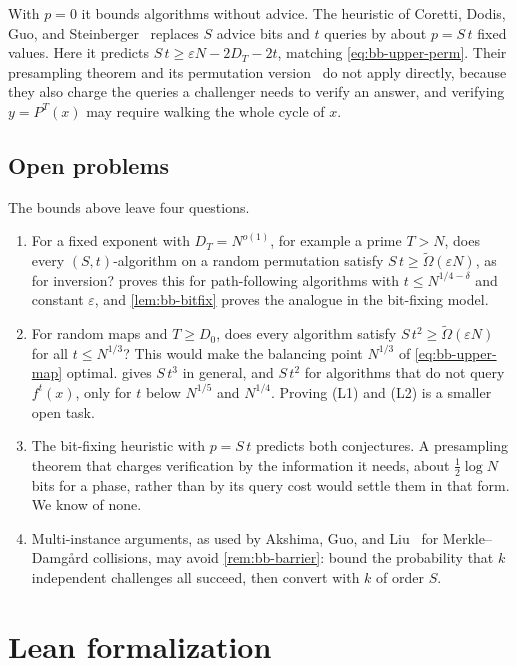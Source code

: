 \documentclass[11pt]{article}
\theoremstyle{definition}
\theoremstyle{remark}
\numberwithin{equation}{section}
\begin{document}
With $p=0$ it bounds algorithms without advice.  The heuristic of
Coretti, Dodis, Guo, and Steinberger~\cite{CDGS18} replaces $S$ advice
bits and $t$ queries by about $p=S\,t$ fixed values.  Here it predicts
$S\,t\geq\varepsilon N-2D_T-2t$, matching \cref{eq:bb-upper-perm}.  Their
presampling theorem and its permutation version~\cite{CDG18} do not apply
directly, because they also charge the queries a challenger needs to
verify an answer, and verifying $y=P^T(x)$ may require walking the whole
cycle of $x$.

\subsection{Open problems}

The bounds above leave four questions.
\begin{enumerate}
\item For a fixed exponent with $D_T=N^{o(1)}$, for example a prime
  $T>N$, does every $(S,t)$-algorithm on a random permutation satisfy
  $S\,t\geq\widetilde\Omega(\varepsilon N)$, as for inversion?
   proves this for path-following algorithms with
  $t\leq N^{1/4-\delta}$ and constant $\varepsilon$, and \cref{lem:bb-bitfix} proves the analogue in
  the bit-fixing model.
\item For random maps and $T\geq D_0$, does every algorithm satisfy
  $S\,t^2\geq\widetilde\Omega(\varepsilon N)$ for all $t\leq N^{1/3}$?
  This would make the balancing point $N^{1/3}$ of \cref{eq:bb-upper-map}
  optimal.   gives $S\,t^3$ in general, and $S\,t^2$ for
  algorithms that do not query $f^t(x)$, only for $t$ below $N^{1/5}$ and
  $N^{1/4}$.  Proving (L1) and (L2) is a smaller open task.
\item The bit-fixing heuristic with $p=S\,t$ predicts both conjectures.
  A presampling theorem that charges verification by the information it
  needs, about $\frac12\log N$ bits for a phase, rather than by its query
  cost would settle them in that form.  We know of none.
\item Multi-instance arguments, as used by Akshima, Guo, and
  Liu~\cite{AGL22} for Merkle--Damg\aa{}rd collisions, may avoid
  \cref{rem:bb-barrier}: bound the probability that $k$ independent
  challenges all succeed, then convert with $k$ of order $S$.
\end{enumerate}


\section{Lean formalization}\label{sec:lean}
\end{document}
